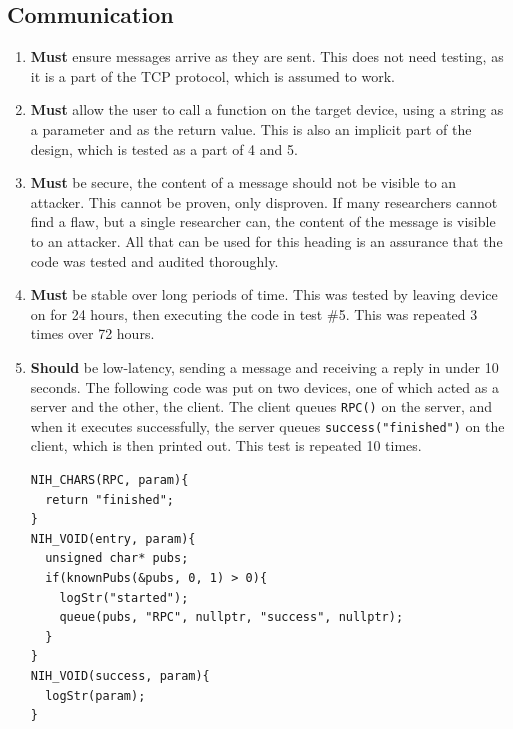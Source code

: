 \documentclass{article}
\begin{document}
\subsection{Communication}
\begin{enumerate}
\item \textbf{Must} ensure messages arrive as they are sent. This does not need testing, as it is a part of the TCP protocol, which is assumed to work.
\item \textbf{Must} allow the user to call a function on the target device, using a
string as a parameter and as the return value. This is also an implicit part of the design, which is tested as a part of 4 and 5.
\item \textbf{Must} be secure, the content of a message should not be visible to
an attacker. This cannot be proven, only disproven. If many researchers cannot find a flaw, but a single researcher can, the content of the message is visible to an attacker. All that can be used for this heading is an assurance that the code was tested and audited thoroughly.
\item \textbf{Must} be stable over long periods of time. This was tested by leaving device on for 24 hours, then executing the code in test \#5. This was repeated 3 times over 72 hours.
\item \textbf{Should} be low-latency, sending a message and receiving a reply in under 10 seconds. The following code was put on two devices, one of which acted as a server and the other, the client. The client queues \texttt{RPC()} on the server, and when it executes successfully, the server queues \texttt{success("finished")} on the client, which is then printed out. This test is repeated 10 times.

\begin{tcolorbox}[colback=white,grow to left by=2.5mm,grow to right by=2.5mm,left*=0mm,right*=0mm,sharp corners]
\begin{verbatim}
NIH_CHARS(RPC, param){
  return "finished";
}
NIH_VOID(entry, param){
  unsigned char* pubs;
  if(knownPubs(&pubs, 0, 1) > 0){
    logStr("started");
    queue(pubs, "RPC", nullptr, "success", nullptr);
  }
}
NIH_VOID(success, param){
  logStr(param);
}
\end{verbatim}
\end{tcolorbox}


\end{enumerate}
\end{document}
